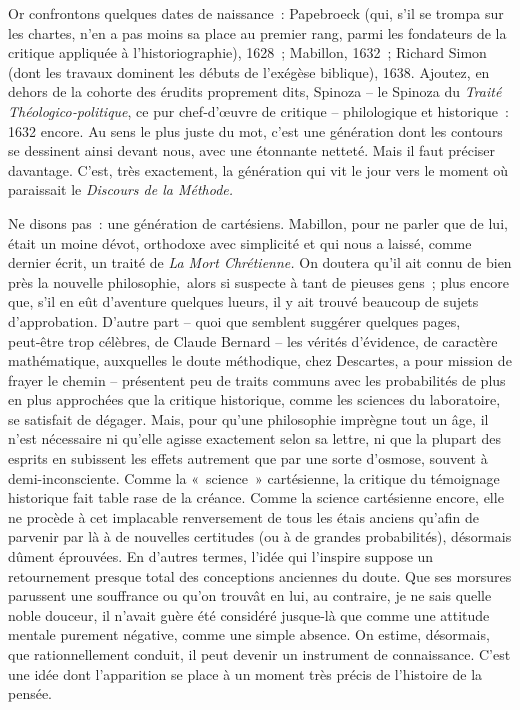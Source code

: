 \documentclass[french,twoside]{book} %
\begin{document}
Or confrontons quelques dates de naissance : Papebroeck (qui, s’il se trompa sur les chartes, n’en a pas moins sa place au premier rang, parmi les fondateurs de la critique appliquée à l’historiographie), 1628 ; Mabillon, 1632 ; Richard Simon (dont les travaux dominent les débuts de l’exégèse biblique), 1638. Ajoutez, en dehors de la cohorte des érudits proprement dits, Spinoza – le Spinoza du \emph{Traité Théologico‑politique}, ce pur chef‑d’œuvre de critique – philologique et historique : 1632 encore. Au sens le plus juste du mot, c’est une génération dont les contours se dessinent ainsi devant nous, avec une étonnante netteté. Mais il faut préciser davantage. C’est, très exactement, la génération qui vit le jour vers le moment où paraissait le \emph{Discours de la Méthode.}\par
Ne disons pas : une génération de cartésiens. Mabillon, pour ne parler que de lui, était un moine dévot, orthodoxe avec simplicité et qui nous a laissé, comme dernier écrit, un traité de \emph{La Mort Chrétienne.} On doutera qu’il ait connu de bien près la nouvelle philosophie, alors si suspecte à  
\label{p38} tant de pieuses gens ; plus encore que, s’il en eût d’aventure quelques lueurs, il y ait trouvé beaucoup de sujets d’approbation. D’autre part – quoi que semblent suggérer quelques pages, peut‑être trop célèbres, de Claude Bernard – les vérités d’évidence, de caractère mathématique, auxquelles le doute méthodique, chez Descartes, a pour mission de frayer le chemin – présentent peu de traits communs avec les probabilités de plus en plus approchées que la critique historique, comme les sciences du laboratoire, se satisfait de dégager. Mais, pour qu’une philosophie imprègne tout un âge, il n’est nécessaire ni qu’elle agisse exactement selon sa lettre, ni que la plupart des esprits en subissent les effets autrement que par une sorte d’osmose, souvent à demi-inconsciente. Comme la « science » cartésienne, la critique du témoignage historique fait table rase de la créance. Comme la science cartésienne encore, elle ne procède à cet implacable renversement de tous les étais anciens qu’afin de parvenir par là à de nouvelles certitudes (ou à de grandes probabilités), désormais dûment éprouvées. En d’autres termes, l’idée qui l’inspire suppose un retournement presque total des conceptions anciennes du doute. Que ses morsures parussent une souffrance ou qu’on trouvât en lui, au contraire, je ne sais quelle noble douceur, il n’avait guère été considéré jusque-là que comme une attitude mentale purement négative, comme une simple absence. On estime, désormais, que rationnellement conduit, il peut de­venir un instrument de connaissance. C’est une idée dont l’apparition se place à un moment très précis de l’histoire de la pensée.\par
\end{document}
